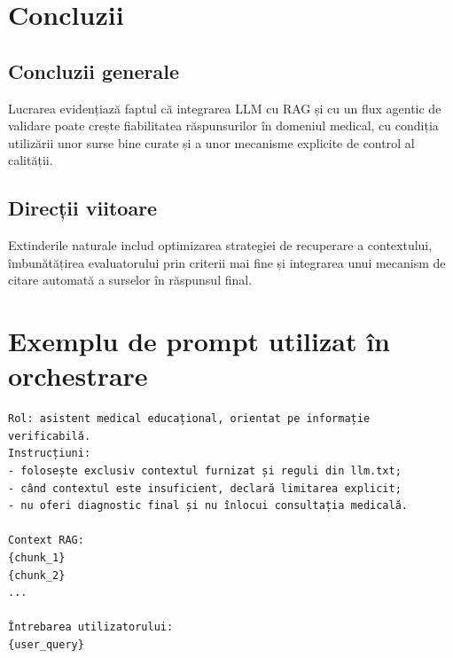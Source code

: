 \documentclass[12pt, a4paper, oneside, romanian]{teza-upb}
\begin{document}
\chapter{Concluzii}
\section{Concluzii generale}
Lucrarea evidențiază faptul că integrarea LLM cu RAG și cu un flux agentic de validare poate crește fiabilitatea răspunsurilor în domeniul medical, cu condiția utilizării unor surse bine curate și a unor mecanisme explicite de control al calității.

\section{Direcții viitoare}
Extinderile naturale includ optimizarea strategiei de recuperare a contextului, îmbunătățirea evaluatorului prin criterii mai fine și integrarea unui mecanism de citare automată a surselor în răspunsul final.





\appendix
\chapter{Exemplu de prompt utilizat în orchestrare}
\begin{verbatim}
Rol: asistent medical educațional, orientat pe informație verificabilă.
Instrucțiuni:
- folosește exclusiv contextul furnizat și reguli din llm.txt;
- când contextul este insuficient, declară limitarea explicit;
- nu oferi diagnostic final și nu înlocui consultația medicală.

Context RAG:
{chunk_1}
{chunk_2}
...

Întrebarea utilizatorului:
{user_query}
\end{verbatim}
\end{document}
